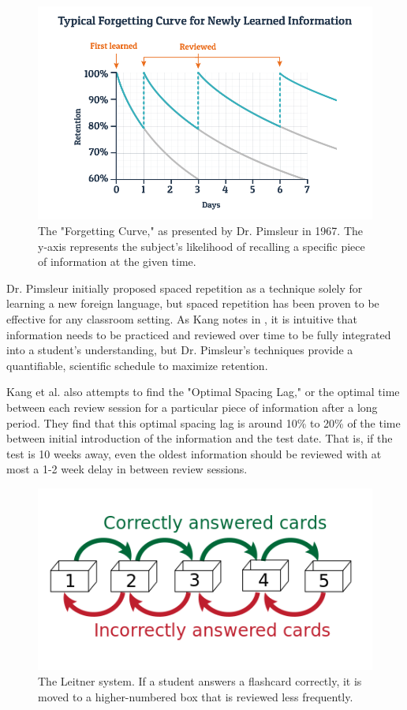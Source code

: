 \begin{figure}[h]
	\includegraphics[width=1.0\linewidth]{figures/forgetting-curve}
	\caption{The "Forgetting Curve," as presented by Dr. Pimsleur in 1967. The y-axis represents the subject's likelihood of recalling a specific piece of information at the given time.}
	\label{fig:forgetting-curve}
\end{figure}

\par Dr. Pimsleur initially proposed spaced repetition as a technique solely for learning a new foreign language, but spaced repetition has been proven to be effective for any classroom setting. As Kang notes in \cite{fiske2016spaced}, it is intuitive that information needs to be practiced and reviewed over time to be fully integrated into a student's understanding, but Dr. Pimsleur's techniques provide a quantifiable, scientific schedule to maximize retention.

\par Kang et al. \cite{fiske2016spaced} also attempts to find the "Optimal Spacing Lag," or the optimal time between each review session for a particular piece of information after a long period. They find that this optimal spacing lag is around 10\% to 20\% of the time between initial introduction of the information and the test date. That is, if the test is 10 weeks away, even the oldest information should be reviewed with at most a 1-2 week delay in between review sessions.

\begin{figure}[h]
	\includegraphics{figures/leitner}
	\caption{The Leitner system. If a student answers a flashcard correctly, it is moved to a higher-numbered box that is reviewed less frequently.}
	\label{fig:leitner}
\end{figure}

